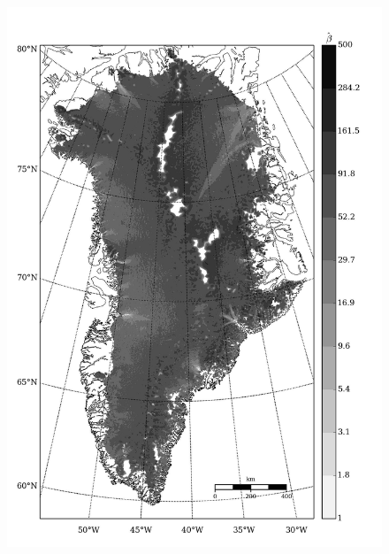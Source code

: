 \begin{figure}
  \centering
  \begin{minipage}[b]{0.47\linewidth}
    \includegraphics[width=1.0\textwidth]{images/greenland/stats/GLM_beta_no_U.jpg}
  \end{minipage}
  \quad
  \begin{minipage}[b]{0.47\linewidth}

\end{minipage}
\end{figure}
